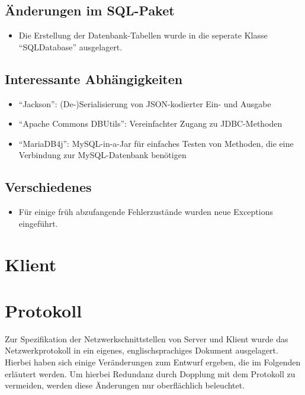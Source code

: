 \documentclass[parskip=full,11pt]{scrartcl}
\begin{document}
\subsection{Änderungen im SQL-Paket}
	\begin{itemize}
		\item Die Erstellung der Datenbank-Tabellen wurde in die seperate
			Klasse \enquote{SQLDatabase} ausgelagert.
	\end{itemize}

\subsection{Interessante Abhängigkeiten}
	\begin{itemize}
		\item \enquote{Jackson}:
			(De-)Serialisierung von JSON-kodierter Ein- und Ausgabe
		\item \enquote{Apache Commons DBUtils}:
			Vereinfachter Zugang zu JDBC-Methoden
		\item \enquote{MariaDB4j}:
			MySQL-in-a-Jar für einfaches Testen von Methoden, die eine
			Verbindung zur MySQL-Datenbank benötigen
	\end{itemize}

\subsection{Verschiedenes}
	\begin{itemize}
	\item Für einige früh abzufangende Fehlerzustände wurden neue Exceptions
		eingeführt.
	\end{itemize}

\pagebreak
\section{Klient}



\pagebreak
\section{Protokoll}

Zur Spezifikation der Netzwerkschnittstellen von Server und Klient wurde das
Netzwerkprotokoll in ein eigenes, englischsprachiges Dokument ausgelagert.
Hierbei haben sich einige Veränderungen zum Entwurf ergeben,
die im Folgenden erläutert werden.
Um hierbei Redundanz durch Dopplung mit dem Protokoll zu vermeiden,
werden diese Änderungen nur oberflächlich beleuchtet.
\end{document}
